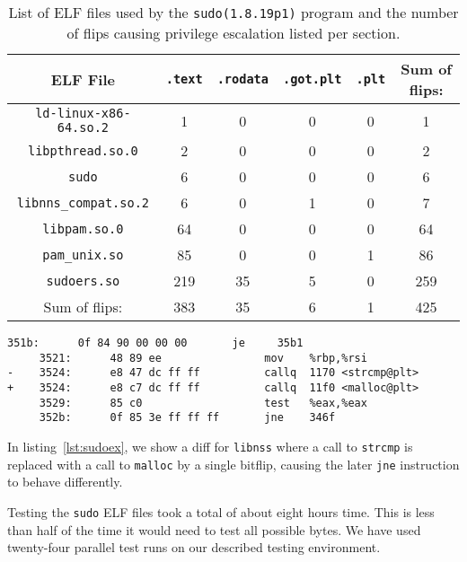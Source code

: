 \begin{table}[!htb]
\centering
\begin{tabular}{c|cccc|c}
ELF File & \texttt{.text}  & \texttt{.rodata} & \texttt{.got.plt} &
\texttt{.plt} & Sum of flips:                             \\ \hline
\texttt{ld-linux-x86-64.so.2} & 1   & 0  & 0  & 0  & 1    \\
\texttt{libpthread.so.0}      & 2   & 0  & 0  & 0  & 2    \\
\texttt{sudo}                 & 6   & 0  & 0  & 0  & 6    \\
\texttt{libnns\_compat.so.2}  & 6   & 0  & 1  & 0  & 7    \\
\texttt{libpam.so.0}          & 64  & 0  & 0  & 0  & 64   \\
\texttt{pam\_unix.so}         & 85  & 0  & 0  & 1  & 86   \\
\texttt{sudoers.so}           & 219 & 35 & 5  & 0  & 259  \\ \hline
Sum of flips:                 & 383 & 35 & 6  & 1  & 425
\end{tabular}
\caption{List of ELF files used by the \texttt{sudo(1.8.19p1)} program and the
number of flips causing privilege escalation listed per section.}
\label{tab:sudores}
\end{table}

\begin{minipage}{\linewidth}
\begin{lstlisting}[style=diff,
                   caption={Diff for a bitflip applied to \texttt{libnss} in
order to bypass a user privilege check. The call to \texttt{strcmp} is
replaced because of the offset in the lookuptable being one off.},
label=lst:sudoex]
     351b:      0f 84 90 00 00 00       je     35b1
     3521:      48 89 ee                mov    %rbp,%rsi
-    3524:      e8 47 dc ff ff          callq  1170 <strcmp@plt>
+    3524:      e8 c7 dc ff ff          callq  11f0 <malloc@plt>
     3529:      85 c0                   test   %eax,%eax
     352b:      0f 85 3e ff ff ff       jne    346f
\end{lstlisting}
\end{minipage}

In listing~\ref{lst:sudoex}, we show a diff for \texttt{libnss} where a call to
\texttt{strcmp} is replaced with a call to \texttt{malloc} by a single bitflip,
causing the later \texttt{jne} instruction to behave differently.

Testing the \texttt{sudo} ELF files took a total of about eight hours time.
This is less than half of the time it would need to test all possible bytes. We
have used twenty-four parallel test runs on our described testing environment.

